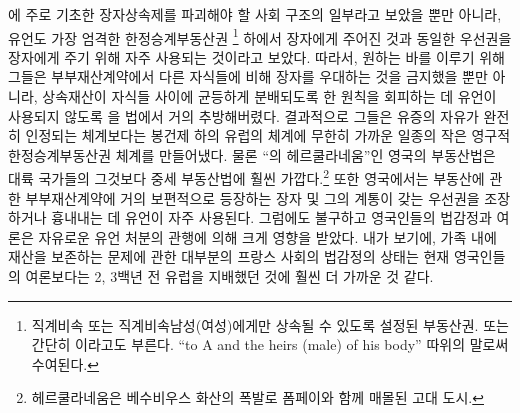 에 주로 기초한
장자상속제를
파괴해야 할 사회 구조의 일부라고
보았을 뿐만 아니라,
유언도
가장 엄격한 한정승계부동산권%
\footnote{직계비속 또는 직계비속남성(여성)에게만 상속될 수 있도록
  설정된 부동산권.
   또는 간단히 이라고도 부른다.
  ``to A and the heirs (male) of his body'' 따위의 말로써 수여된다.
  }
하에서 장자에게 주어진 것과
동일한 우선권을
장자에게
주기 위해 자주 사용되는 것이라고 보았다.
따라서,
원하는 바를 이루기 위해 그들은
부부재산계약에서 다른 자식들에 비해 장자를 우대하는 것을 금지했을 뿐만 아니라,
상속재산이 자식들 사이에 균등하게 분배되도록 한 원칙을 회피하는 데
유언이
사용되지 않도록
을 법에서 거의 추방해버렸다.
결과적으로 그들은
유증의 자유가 완전히 인정되는 체계보다는
봉건제 하의 유럽의 체계에 무한히 가까운
일종의 작은 영구적 한정승계부동산권 체계를 만들어냈다.
물론
``의 헤르쿨라네움''인 영국의 부동산법은
대륙 국가들의 그것보다 중세 부동산법에 훨씬 가깝다.\footnote{%
  헤르쿨라네움은 베수비우스 화산의 폭발로 폼페이와 함께 매몰된 고대 도시.}
또한 영국에서는
부동산에 관한 부부재산계약에 거의 보편적으로 등장하는
장자 및 그의 계통이 갖는 우선권을 조장하거나 흉내내는 데
유언이
자주 사용된다.
그럼에도 불구하고 영국인들의 법감정과 여론은
자유로운 유언 처분의 관행에 의해 크게 영향을 받았다.
내가 보기에,
가족 내에 재산을 보존하는 문제에 관한
대부분의 프랑스 사회의 법감정의 상태는
현재 영국인들의 여론보다는 2, 3백년 전 유럽을 지배했던 것에
훨씬 더 가까운 것 같다.

